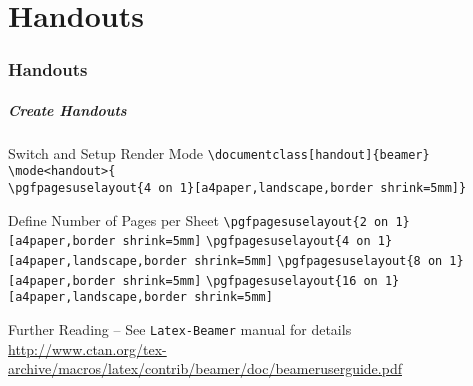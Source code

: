 \part{Handouts}
\makepart
\section{Handouts}
\begin{frame}[fragile,label=handouts,t]
        \frametitle{Create Handouts}
        \begin{block}{Switch and Setup Render Mode}
     \scriptsize
                \verb+\documentclass[handout]{beamer}+\\
                        \verb+\mode<handout>{+\\
                        \verb+\pgfpagesuselayout{4 on 1}[a4paper,landscape,border shrink=5mm]}+
    \end{block}
        \begin{block}{Define Number of Pages per Sheet}
        \scriptsize
        \verb+\pgfpagesuselayout{2 on 1}[a4paper,border shrink=5mm]+
        \verb+\pgfpagesuselayout{4 on 1}[a4paper,landscape,border shrink=5mm]+
        \verb+\pgfpagesuselayout{8 on 1}[a4paper,border shrink=5mm]+
        \verb+\pgfpagesuselayout{16 on 1}[a4paper,landscape,border shrink=5mm]+
    \end{block}
        \begin{block}{Further Reading -- See {\tt Latex-Beamer} manual for details}
        {\scriptsize
        \url{http://www.ctan.org/tex-archive/macros/latex/contrib/beamer/doc/beameruserguide.pdf}}
    \end{block}
\end{frame}
